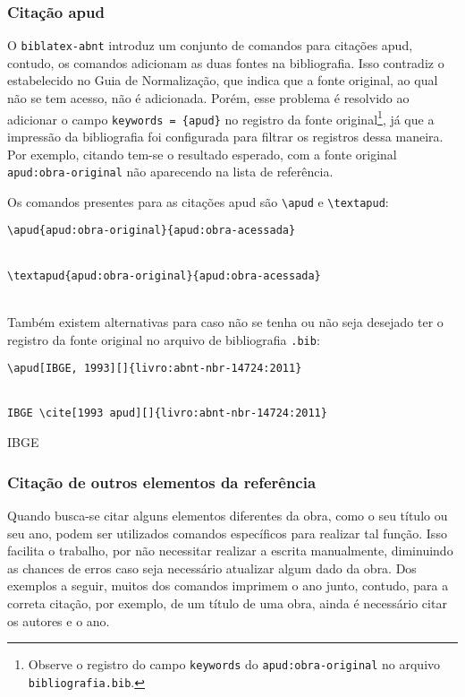 \subsubsection{Citação apud}
O \texttt{biblatex-abnt} introduz um conjunto de comandos para citações apud, contudo, os comandos adicionam as duas fontes na bibliografia. Isso contradiz o estabelecido no Guia de Normalização, que indica que a fonte original, ao qual não se tem acesso, não é adicionada. Porém, esse problema é resolvido ao adicionar o campo \verb|keywords = {apud}| no registro da fonte original\footnote{Observe o registro do campo \texttt{keywords} do \texttt{apud:obra-original} no arquivo \texttt{bibliografia.bib}.}, já que a impressão da bibliografia foi configurada para filtrar os registros dessa maneira. Por exemplo, citando tem-se o resultado esperado, com a fonte original \texttt{apud:obra-original} não aparecendo na lista de referência.

Os comandos presentes para as citações apud são \verb|\apud| e \verb|\textapud|:

\verb|\apud{apud:obra-original}{apud:obra-acessada}|

\\

\verb|\textapud{apud:obra-original}{apud:obra-acessada}|

\\

Também existem alternativas para caso não se tenha ou não seja desejado ter o registro da fonte original no arquivo de bibliografia \texttt{.bib}:

\verb|\apud[IBGE, 1993][]{livro:abnt-nbr-14724:2011}|

\\

\verb|IBGE \cite[1993 apud][]{livro:abnt-nbr-14724:2011}|

IBGE \cite[1993 apud][]{livro:abnt-nbr-14724:2011}

\subsubsection{Citação de outros elementos da referência}
Quando busca-se citar alguns elementos diferentes da obra, como o seu título ou seu ano, podem ser utilizados comandos específicos para realizar tal função. Isso facilita o trabalho, por não necessitar realizar a escrita manualmente, diminuindo as chances de erros caso seja necessário atualizar algum dado da obra. Dos exemplos a seguir, muitos dos comandos imprimem o ano junto, contudo, para a correta citação, por exemplo, de um título de uma obra, ainda é necessário citar os autores e o ano.

